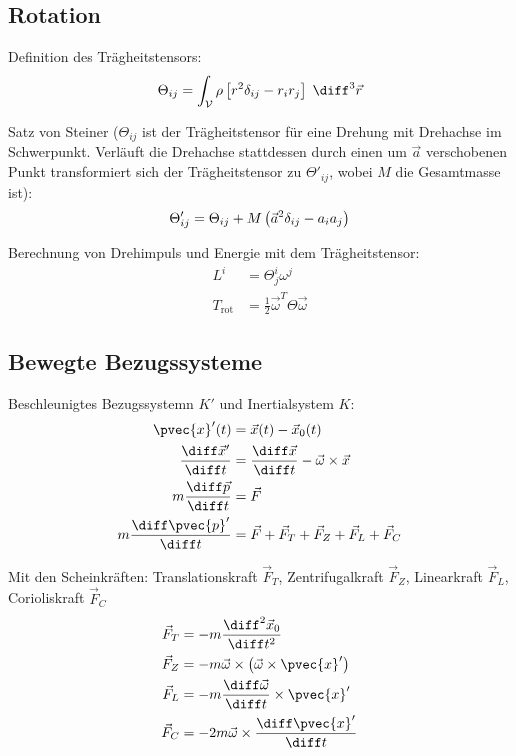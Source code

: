 \documentclass[11pt]{article}
\numberwithin{equation}{section}
\begin{document}
		\subsection{Rotation}
			\noindent
			Definition des Trägheitstensors:
			\begin{equation}
				\Theta_{ij}=\int_{\mathcal{V}} \rho \left[r^2\delta_{ij}-r_i r_j\right] \;\diff^3\vec{r}
			\end{equation}

			\noindent
			Satz von Steiner ($\Theta_{ij}$ ist der Trägheitstensor für eine Drehung mit Drehachse im Schwerpunkt. Verläuft die Drehachse stattdessen durch einen um $\vec{a}$ verschobenen Punkt transformiert sich der Trägheitstensor zu $\Theta'_{ij}$, wobei $M$ die Gesamtmasse ist):
			\begin{equation}
				\Theta'_{ij} = \Theta_{ij} + M\left( \vec{a}^2\delta_{ij} - a_i a_j \right)
			\end{equation}

			\noindent
			Berechnung von Drehimpuls und Energie mit dem	Trägheitstensor:
			\begin{equation}
				\begin{aligned}
					L^i &= \Theta^i_j \omega^j \\
					T_{\mathrm{rot}} &= \frac{1}{2}\vec{\omega}^T \Theta \vec{\omega}
				\end{aligned}
			\end{equation}

		\subsection{Bewegte Bezugssysteme}
			\noindent
			Beschleunigtes Bezugssystemn $K'$ und Inertialsystem $K$:
			\begin{equation}
				\begin{aligned}
					\pvec{x}'(t) &= \vec{x}(t)-\vec{x}_0(t) \\
					\tder{\vec{x}'}{t} &= \tder{\vec{x}}{t}-\vec{\omega}\times\vec{x} \\
					m\tder{\vec{p}}{t} &= \vec{F} \\
					m\tder{\pvec{p}'}{t} &= \vec{F} + \vec{F}_T + \vec{F}_Z + \vec{F}_L + \vec{F}_C \\
				\end{aligned}
			\end{equation}

			\noindent
			Mit den Scheinkräften: Translationskraft $\vec{F}_T$, Zentrifugalkraft $\vec{F}_Z$, Linearkraft $\vec{F}_L$, Corioliskraft $\vec{F}_C$
			\begin{equation}
				\begin{aligned}
					\vec{F}_T &= -m\frac{\diff^2 \vec{x}_0}{\diff t^2} \\
					\vec{F}_Z &= -m\vec{\omega}\times\Br{\vec{\omega}\times\pvec{x}'} \\
					\vec{F}_L &= -m\tder{\vec{\omega}}{t}\times\pvec{x}' \\
					\vec{F}_C &= -2m\vec{\omega}\times\tder{\pvec{x}'}{t} \\
				\end{aligned}
			\end{equation}
\end{document}

